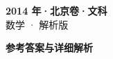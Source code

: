 \documentclass[zihao=-4, a4paper]{ctexart}
\begin{document}
\begin{center}
  {\Large\bfseries 2014 年·北京卷·文科}\\[4pt]
  {\large 数学 · 解析版}
\end{center}
\medskip
{}

\clearpage
{}
\begin{center}{\Large\bfseries 参考答案与详细解析}\end{center}
\medskip

\end{document}
